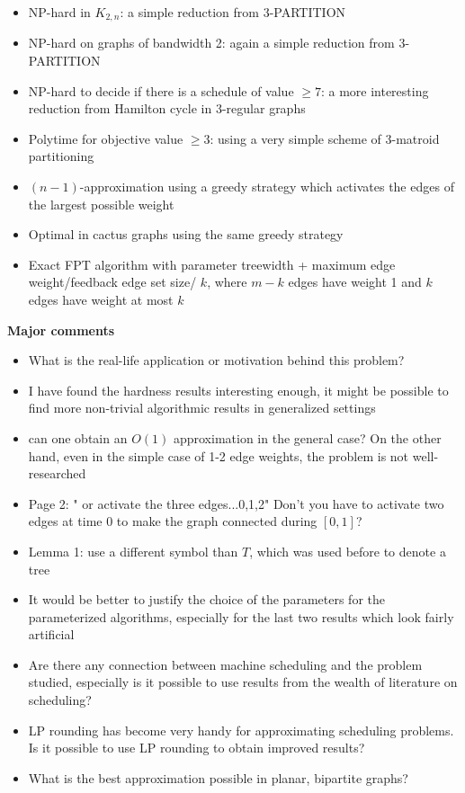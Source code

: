 \documentclass[11pt,a4paper]{article}
\begin{document}
\begin{itemize}
\item NP-hard in $K_{2,n}$: a simple reduction from 3-PARTITION
\item NP-hard on graphs of bandwidth 2: again a simple reduction from 3-PARTITION
\item NP-hard to decide if there is a schedule of value $\geq 7$: a more interesting reduction from Hamilton cycle in 3-regular graphs

\item Polytime for objective value $\geq 3$: using a very simple scheme of 3-matroid partitioning    
\item $(n-1)$-approximation using a greedy strategy which activates the edges of the largest possible weight
\item Optimal in cactus graphs using the same greedy strategy
\item Exact FPT algorithm with parameter treewidth + maximum edge weight/feedback edge set size/ $k$, where $m-k$ edges have weight 1 and $k$ edges have weight at most $k$
\end{itemize}

\textbf{Major comments}
\begin{itemize}

\item What is the real-life application or motivation behind this problem? 
\item I have found the hardness results interesting enough, it might be possible to find more non-trivial algorithmic results in generalized settings 
\item can one obtain an $O(1)$ approximation in the general case? On the other hand, even in the simple case of 1-2 edge weights, the problem is not well-researched
\item Page 2: " or activate the three edges...0,1,2" Don't you have to activate two edges at time 0 to make the graph connected during $[0,1]$?
\item Lemma 1: use a different symbol than $T$, which was used before to denote a tree
\item It would be better to justify the choice of the parameters for the parameterized algorithms, especially for the last two results which look fairly artificial
\item Are there any connection between machine scheduling and the problem studied, especially is it possible to use results from the wealth of literature on scheduling?
\item LP rounding has become very handy for approximating scheduling problems. Is it possible to use LP rounding to obtain improved results?
\item What is the best approximation possible in planar, bipartite graphs? 
\end{itemize}
\end{document}
